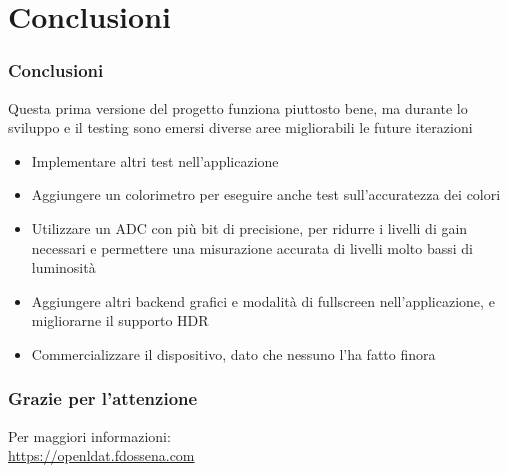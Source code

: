 \documentclass[xcolor={x11names}]{beamer}
\begin{document}
\section{Conclusioni}
\begin{frame}
	\frametitle{Conclusioni}
	Questa prima versione del progetto funziona piuttosto bene, ma durante lo sviluppo e il testing sono emersi diverse aree migliorabili le future iterazioni
	\begin{itemize}
		\item Implementare \alert{altri test} nell'applicazione
		\item Aggiungere un \alert{colorimetro} per eseguire anche test sull'accuratezza dei colori
		\item Utilizzare un \alert{ADC con più bit} di precisione, per ridurre i livelli di gain necessari e permettere una misurazione accurata di livelli molto bassi di luminosità
		\item Aggiungere \alert{altri backend grafici e modalità di fullscreen} nell'applicazione, e \alert{migliorarne il supporto HDR}
		\item \alert{Commercializzare il dispositivo}, dato che nessuno l'ha fatto finora
	\end{itemize}
\end{frame}
\begin{frame}
	\frametitle{Grazie per l'attenzione}
	\centering
	Per maggiori informazioni:\\
	\alert{\url{https://openldat.fdossena.com}}
\end{frame}
\end{document}
